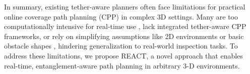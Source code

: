 In summary, existing tether-aware planners often face limitations for practical online coverage path planning (CPP) in complex 3D settings. Many are too computationally intensive for real-time use \cite{mechsy2017novel, hert1999motion, patil2023coordinating, cao2023path}, lack integrated tether-aware CPP frameworks, or rely on simplifying assumptions like 2D environments or basic obstacle shapes \cite{kim, withy, cao2023neptune}, hindering generalization to real-world inspection tasks.
To address these limitations, we propose \ac{REACT}, a novel approach that enables real-time, entanglement-aware path planning in arbitrary 3-D environments.
















































